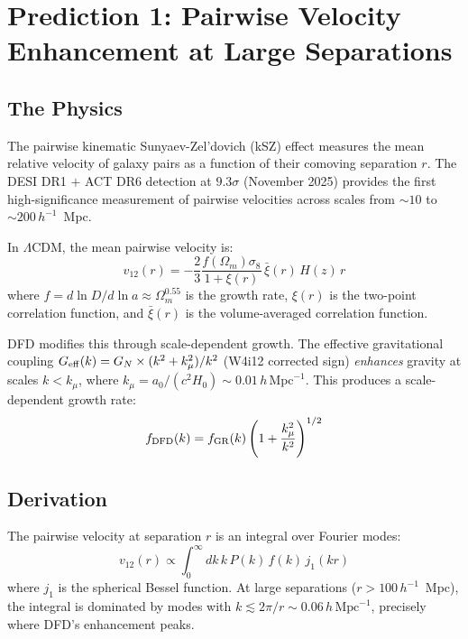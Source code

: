 \documentclass[11pt]{article}
\newcommand{\LCDM}{$\Lambda$CDM}
\begin{document}
\section{Prediction 1: Pairwise Velocity Enhancement at Large Separations}
\label{sec:pairwise}

\subsection{The Physics}

The pairwise kinematic Sunyaev-Zel'dovich (kSZ) effect measures the mean
relative velocity of galaxy pairs as a function of their comoving separation
$r$. The DESI DR1 $+$ ACT DR6 detection at $9.3\sigma$ (November 2025)
provides the first high-significance measurement of pairwise velocities
across scales from $\sim 10$ to $\sim 200\,h^{-1}$~Mpc.

In \LCDM, the mean pairwise velocity is:
\begin{equation}
v_{12}(r) = -\frac{2}{3}\frac{f(\Omega_m)\sigma_8}{1 + \xi(r)}\,\bar{\xi}(r)\,H(z)\,r
\end{equation}
where $f = d\ln D/d\ln a \approx \Omega_m^{0.55}$ is the growth rate,
$\xi(r)$ is the two-point correlation function, and $\bar{\xi}(r)$ is
the volume-averaged correlation function.

DFD modifies this through scale-dependent growth. The effective gravitational
coupling $G_{\rm eff}(k) = G_N \times (k^2 + k_\mu^2)/k^2$ (W4i12 corrected
sign) \emph{enhances} gravity at scales $k < k_\mu$, where
$k_\mu = a_0/(c^2 H_0) \sim 0.01\,h\,\text{Mpc}^{-1}$. This produces
a scale-dependent growth rate:
\begin{equation}
f_{\rm DFD}(k) = f_{\rm GR}(k)\left(1 + \frac{k_\mu^2}{k^2}\right)^{1/2}
\end{equation}

\subsection{Derivation}

The pairwise velocity at separation $r$ is an integral over Fourier modes:
\begin{equation}
v_{12}(r) \propto \int_0^\infty dk\,k\,P(k)\,f(k)\,j_1(kr)
\end{equation}
where $j_1$ is the spherical Bessel function. At large separations
($r > 100\,h^{-1}$~Mpc), the integral is dominated by modes with
$k \lesssim 2\pi/r \sim 0.06\,h\,\text{Mpc}^{-1}$, precisely where
DFD's enhancement peaks.
\end{document}
